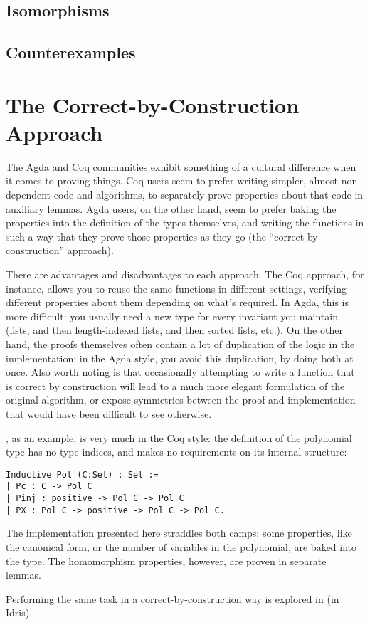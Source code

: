 \documentclass[draft, twocolumn]{article}
\theoremstyle{definition}
\begin{document}
\subsection{Isomorphisms}
\subsection{Counterexamples}
\section{The Correct-by-Construction Approach}
The Agda and Coq communities exhibit something of a cultural difference when it
comes to proving things. Coq users seem to prefer writing simpler, almost
non-dependent code and algorithms, to separately prove properties about that
code in auxiliary lemmas. Agda users, on the other hand, seem to prefer baking
the properties into the definition of the types themselves, and writing the
functions in such a way that they prove those properties as they go (the
``correct-by-construction'' approach).

There are advantages and disadvantages to each approach. The Coq approach, for
instance, allows you to reuse the same functions in different settings,
verifying different properties about them depending on what's required. In Agda,
this is more difficult: you usually need a new type for every invariant you
maintain (lists, and then length-indexed lists, and then sorted lists, etc.). On
the other hand, the proofs themselves often contain a lot of duplication of the
logic in the implementation: in the Agda style, you avoid this duplication, by
doing both at once. Also worth noting is that occasionally attempting to write a
function that is correct by construction will lead to a much more elegant
formulation of the original algorithm, or expose symmetries between the proof
and implementation that would have been difficult to see otherwise.

\cite{hutchison_proving_2005}, as an example, is very much in the Coq style: the
definition of the polynomial type has no type indices, and makes no requirements
on its internal structure:
\begin{verbatim}
Inductive Pol (C:Set) : Set :=
| Pc : C -> Pol C
| Pinj : positive -> Pol C -> Pol C
| PX : Pol C -> positive -> Pol C -> Pol C.
\end{verbatim}

The implementation presented here straddles both camps: some properties, like
the canonical form, or the number of variables in the polynomial, are baked into
the type. The homomorphism properties, however, are proven in separate lemmas.

Performing the same task in a correct-by-construction way is explored
in\cite{geuvers_automatically_2017} (in Idris\cite{brady_idris_2013}).

\begin{figure*}
\end{figure*}


\end{document}
